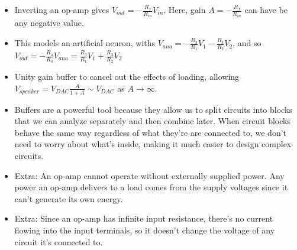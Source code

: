 \documentclass{article}
\begin{document}
\begin{itemize}
	\item Inverting an op-amp gives {\color{red} $V_{out} = -\frac{R_f}{R_{in}} V_{in}$}. Here, gain $A = -\frac{R_f}{R_{in}}$ can have be any negative value.

	\item This models an artificial neuron, withs $V_{ana} = -\frac{R_3}{R_1}V_1 - \frac{R_3}{R_2}V_2$, and so {\color{red} $V_{out} = -\frac{R_4}{R_4}V_{ana} = \frac{R_3}{R_1}V_1 + \frac{R_3}{R_2}V_2$}

	\item {\color{blue} Unity gain buffer} to cancel out the effects of loading, allowing $V_{speaker} = V_{DAC}\frac{A}{1+A}\sim V_{DAC}$ as $A\rightarrow\infty$.
	\item Buffers are a powerful tool because they allow us to split circuits into blocks that we can analyze separately and then combine later. When circuit blocks behave the same way regardless of what they’re are connected to, we don’t need to worry about what’s inside, making it much easier to design complex circuits.

	\item Extra: An op-amp cannot operate without externally supplied power. Any power an op-amp delivers to a load comes from the supply voltages since it can't generate its own energy.
	\item Extra: Since an op-amp has infinite input resistance, there's no current flowing into the input terminals, so it doesn't change the voltage of any circuit it's connected to.


\end{itemize}
\end{document}
